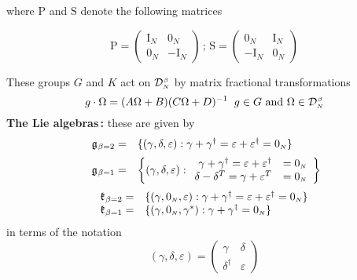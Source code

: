 \documentclass[draftclsnofoot]{IEEEtran}
\begin{document}
\noindent where $\mathrm{P}$ and $\mathrm{S}$ denote the following matrices

$$
\mathrm{P} = \left(\begin{array}{cc} \mathrm{I}_{\scriptscriptstyle N} & \mathrm{0}_{\scriptscriptstyle N} \\ \mathrm{0}_{\scriptscriptstyle N} & -\mathrm{I}_{\scriptscriptstyle N} \end{array}\right) \,;\,
\mathrm{S} = 
\left(\begin{array}{cc} \mathrm{0}_{\scriptscriptstyle N} & \mathrm{I}_{\scriptscriptstyle N} \\ -\mathrm{I}_{\scriptscriptstyle N} & \mathrm{0}_{\scriptscriptstyle N} \end{array}\right)
$$
\vspace{0.1cm}

\noindent These groups $G$ and $K$ act on $\mathcal{D}^{\hspace{0.02cm}\scriptscriptstyle \beta}_{\scriptscriptstyle N}$ by matrix fractional transformations
$$
g \cdot \Omega = (A\Omega + B)(C\Omega + D)^{-1} \hspace{0.2cm} g\in G \text{ and  }\Omega \in \mathcal{D}^{\hspace{0.02cm}\scriptscriptstyle \beta}_{\scriptscriptstyle N}
$$
\noindent \textbf{The Lie algebras\,:} these are given by
$$
\begin{array}{rl}\mathfrak{g}_{\hspace{0.02cm}\beta = 2} = &\lbrace (\gamma,\delta,\varepsilon): \gamma + \gamma^\dagger = \varepsilon + \varepsilon^\dagger = \mathrm{0}_{\scriptscriptstyle N}\rbrace \\[0.2cm]
\mathfrak{g}_{\hspace{0.02cm}\beta = 1} = & \left\lbrace (\gamma,\delta,\varepsilon): \begin{array}{rl}\gamma + \gamma^\dagger = \varepsilon + \varepsilon^\dagger & = \mathrm{0}_{\scriptscriptstyle N} \\ \delta - \delta^T = \gamma + \varepsilon^T  & = \mathrm{0}_{\scriptscriptstyle N}\end{array} \right\rbrace \!\!
\end{array}
$$
$$
\begin{array}{rl}
\mathfrak{k}_{\hspace{0.02cm}\beta = 2} = & \lbrace (\gamma,\mathrm{0}_{\scriptscriptstyle N},\varepsilon): \gamma + \gamma^\dagger = \varepsilon + \varepsilon^\dagger = \mathrm{0}_{\scriptscriptstyle N}\rbrace \\ \mathfrak{k}_{\hspace{0.02cm}\beta = 1} = & \lbrace (\gamma,\mathrm{0}_{\scriptscriptstyle N},\gamma^*): \gamma + \gamma^\dagger = \mathrm{0}_{\scriptscriptstyle N}\rbrace \end{array}
$$
in terms of the notation
$$
(\gamma,\delta,\varepsilon) = \left(\begin{array}{cc} \gamma & \delta \\ \delta^\dagger & \varepsilon \end{array}\right)
$$
\end{document}
